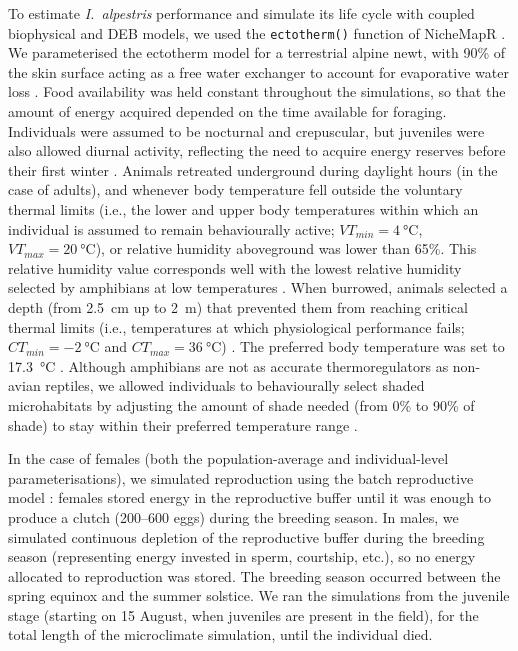 \documentclass[12pt]{article}
\begin{document}
To estimate \textit{I.~alpestris} performance and simulate its life cycle with coupled biophysical and DEB models, we used the \texttt{ectotherm()} function of NicheMapR \parencite{kearney2020c}. We parameterised the ectotherm model for a terrestrial alpine newt, with 90\% of the skin surface acting as a free water exchanger to account for evaporative water loss \parencite{enriquez-urzelai2024}. Food availability was held constant throughout the simulations, so that the amount of energy acquired depended on the time available for foraging. Individuals were assumed to be nocturnal and crepuscular, but juveniles were also allowed diurnal activity, reflecting the need to acquire energy reserves before their first winter \parencite{enriquez-urzelai2020}. Animals retreated underground during daylight hours (in the case of adults), and whenever body temperature fell outside the voluntary thermal limits (i.e., the lower and upper body temperatures within which an individual is assumed to remain behaviourally active; $VT_{min}=\qty{4}{\celsius}$, $VT_{max}=\qty{20}{\celsius}$), or relative humidity aboveground was lower than 65\%. This relative humidity value corresponds well with the lowest relative humidity selected by amphibians at low temperatures \parencite{bonnefond2020,giacometti2025}. When burrowed, animals selected a depth (from \qty{2.5}{\cm} up to \qty{2}{\m}) that prevented them from reaching critical thermal limits (i.e., temperatures at which physiological performance fails; $CT_{min} = \qty{-2}{\celsius}$ and $CT_{max} = \qty{36}{\celsius}$) \parencite{enriquez-urzelai2024}. The preferred body temperature was set to \qty{17.3}{\celsius} \parencite{gvozdik2017}. Although amphibians are not as accurate thermoregulators as non-avian reptiles, we allowed individuals to behaviourally select shaded microhabitats by adjusting the amount of shade needed (from 0\% to 90\% of shade) to stay within their preferred temperature range \parencite{enriquez-urzelai2019}.

In the case of females (both the population-average and individual-level parameterisations), we simulated reproduction using the batch reproductive model \parencite{pecquerie2009}: females stored energy in the reproductive buffer until it was enough to produce a clutch (200--600 eggs) during the breeding season. In males, we simulated continuous depletion of the reproductive buffer during the breeding season (representing energy invested in sperm, courtship, etc.), so no energy allocated to reproduction was stored. The breeding season occurred between the spring equinox and the summer solstice. We ran the simulations from the juvenile stage (starting on 15 August, when juveniles are present in the field), for the total length of the microclimate simulation, until the individual died.
\end{document}
